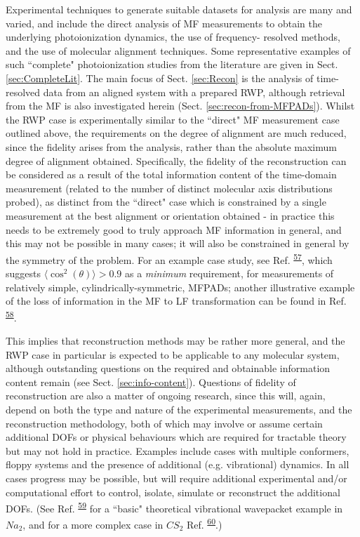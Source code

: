 \documentclass[10pt]{article}
\begin{document}
Experimental techniques to generate suitable datasets for analysis are many and varied, and include the direct analysis of MF measurements to obtain the underlying photoionization dynamics, the use of frequency- resolved methods, and the use of molecular alignment techniques. Some representative examples of such ``complete" photoionization studies from the literature are given in Sect. \ref{sec:CompleteLit}. %
The main focus of Sect. \ref{sec:Recon} is the analysis of time-resolved data from an aligned system with a prepared RWP, although retrieval from the MF is also investigated herein (Sect. \ref{sec:recon-from-MFPADs}). Whilst the RWP case is experimentally similar to the ``direct" MF measurement case outlined above, the requirements on the degree of alignment are much reduced, since the fidelity arises from the analysis, rather than the absolute maximum degree of alignment obtained. Specifically, the fidelity of the reconstruction can be considered as a result of the total information content of the time-domain measurement (related to the number of distinct molecular axis distributions probed), as distinct from the ``direct" case which is constrained by a single measurement at the best alignment or orientation obtained - in practice this needs to be extremely good to truly approach MF information in general, and this may not be possible in many cases; it will also be constrained in general by the symmetry of the problem. For an example case study, see Ref. \textsuperscript{\hyperref[csl:57]{57}}, which suggests $\langle\cos^2(\theta)\rangle>0.9$ as a \textit{minimum} requirement, for measurements of relatively simple, cylindrically-symmetric, MFPADs; another illustrative example of the loss of information in the MF to LF transformation can be found in Ref. \textsuperscript{\hyperref[csl:58]{58}}.

This implies that reconstruction methods may be rather more general, and the RWP case in particular is expected to be applicable to any molecular system, although outstanding questions on the required and obtainable information content remain (see Sect. \ref{sec:info-content}). Questions of fidelity of reconstruction are also a matter of ongoing research, since this will, again, depend on both the type and nature of the experimental measurements, and the reconstruction methodology, both of which may involve or assume certain additional DOFs or physical behaviours which are required for tractable theory but may not hold in practice. Examples include cases with multiple conformers, floppy systems and the presence of additional (e.g. vibrational) dynamics. In all cases progress may be possible, but will require additional experimental and/or computational effort to control, isolate, simulate or reconstruct the additional DOFs. (See Ref. \textsuperscript{\hyperref[csl:59]{59}} for a ``basic" theoretical vibrational wavepacket example in $Na_2$, and for a more complex case in $CS_2$ Ref. \textsuperscript{\hyperref[csl:60]{60}}.)
\end{document}
